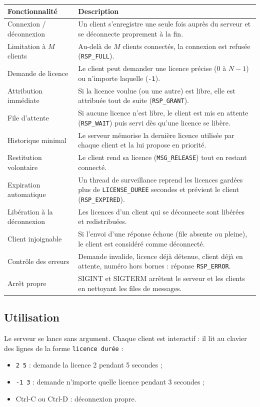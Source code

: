 \documentclass[11pt,a4paper]{article}
\newcommand{\code}[1]{\texttt{#1}}
\begin{document}
\begin{tabularx}{\textwidth}{@{}>{\raggedright\arraybackslash}p{4.2cm}Y@{}}
\toprule
\textbf{Fonctionnalité} & \textbf{Description}\\
\midrule
Connexion / déconnexion & Un client s'enregistre une seule fois auprès du serveur et se déconnecte proprement à la fin.\\
Limitation à $M$ clients & Au-delà de $M$ clients connectés, la connexion est refusée (\code{RSP\_FULL}).\\
Demande de licence & Le client peut demander une licence précise (0 à $N-1$) ou n'importe laquelle (\code{-1}).\\
Attribution immédiate & Si la licence voulue (ou une autre) est libre, elle est attribuée tout de suite (\code{RSP\_GRANT}).\\
File d'attente & Si aucune licence n'est libre, le client est mis en attente (\code{RSP\_WAIT}) puis servi dès qu'une licence se libère.\\
Historique minimal & Le serveur mémorise la dernière licence utilisée par chaque client et la lui propose en priorité.\\
Restitution volontaire & Le client rend sa licence (\code{MSG\_RELEASE}) tout en restant connecté.\\
Expiration automatique & Un thread de surveillance reprend les licences gardées plus de \code{LICENSE\_DUREE} secondes et prévient le client (\code{RSP\_EXPIRED}).\\
Libération à la déconnexion & Les licences d'un client qui se déconnecte sont libérées et redistribuées.\\
Client injoignable & Si l'envoi d'une réponse échoue (file absente ou pleine), le client est considéré comme déconnecté.\\
Contrôle des erreurs & Demande invalide, licence déjà détenue, client déjà en attente, numéro hors bornes : réponse \code{RSP\_ERROR}.\\
Arrêt propre & SIGINT et SIGTERM arrêtent le serveur et les clients en nettoyant les files de messages.\\
\bottomrule
\end{tabularx}

\subsection{Utilisation}

Le serveur se lance sans argument. Chaque client est interactif : il lit au clavier des lignes de la forme \code{licence durée} :
\begin{itemize}
  \item \code{2 5} : demande la licence 2 pendant 5 secondes ;
  \item \code{-1 3} : demande n'importe quelle licence pendant 3 secondes ;
  \item Ctrl-C ou Ctrl-D : déconnexion propre.
\end{itemize}
\end{document}
